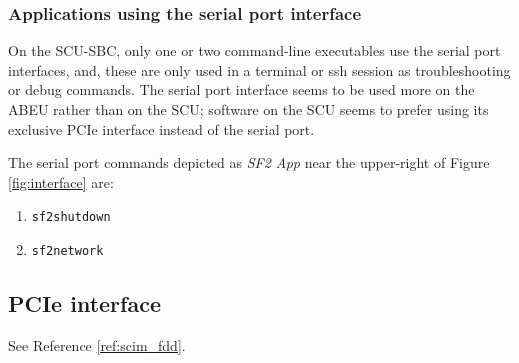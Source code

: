 \documentclass[12pt]{article}
\begin{document}
{\begin{table}[H]
{\begin{tabular}{p{4.0in}p{3.0in}}
    \hline
    \end{tabular}%
    }
    \label{tab:serial_cmd}
\end{table}

\subsubsection{Applications using the serial port interface}
On the SCU-SBC, only one or two command-line executables use the serial port interfaces, and, these are only used in a terminal or ssh session as troubleshooting or debug commands. The serial port interface seems to be used more on the ABEU rather than on the SCU; software on the SCU seems to prefer using its exclusive PCIe interface instead of the serial port.

The serial port commands depicted as \emph{SF2 App} near the upper-right of Figure \ref{fig:interface} are:

\begin{enumerate}
    \item \texttt{sf2shutdown}
    \item \texttt{sf2network}
\end{enumerate}


\subsection{PCIe interface}

See Reference \ref{ref:scim_fdd}.

}
\end{document}
